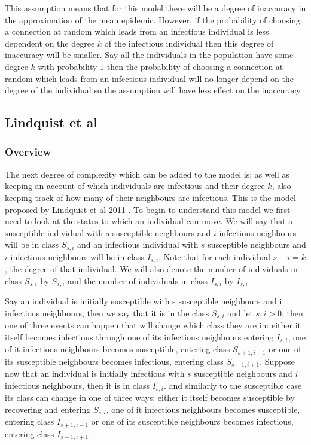 \documentclass{uonmathsreport}
\begin{document}
This assumption means that for this model there will be a degree of inaccuracy in the approximation of the mean epidemic. However, if the probability of choosing a connection at random which leads from an infectious individual is less dependent on the degree $k$ of the infectious individual then this degree of inaccuracy will be smaller. Say all the individuals in the population have some degree $k$ with probability $1$ then the probability of choosing a connection at random which leads from an infectious individual will no longer depend on the degree of the individual so the assumption will have less effect on the inaccuracy.

\subsection{Lindquist et al} \label{subsec:6.2}

\subsubsection{Overview} \label{subsub:6.2.1}
\indent
The next degree of complexity which can be added to the model is: as well as keeping an account of which individuals are infectious and their degree $k$, also keeping track of how many of their neighbours are infectious. This is the model proposed by Lindquist et al 2011 \cite{biblindquist}. To begin to understand this model we first need to look at the states to which an individual can move. We will say that a susceptible individual with $s$ susceptible neighbours and $i$ infectious neighbours will be in class $S_{s,i}$ and  an infectious individual with $s$ susceptible neighbours and $i$ infectious neighbours will be in class $I_{s,i}$. Note that for each individual $s+i=k$, the degree of that individual. We will also denote the number of individuals in class $S_{s,i}$ by $S_{s,i}$ and the number of individuals in class $I_{s,i}$ by $I_{s,i}$.
\par
Say an individual is initially susceptible with s susceptible neighbours and i infectious neighbours, then we say that it is in the class $S_{s,i}$ and let $s,i>0$, then one of three events can happen that will change which class they are in: either it itself becomes infectious through one of its infectious neighbours entering $I_{s,i}$, one of it infectious neighbours becomes susceptible, entering class $S_{s+1,i-1}$ or one of its susceptible neighbours becomes infectious, entering class $S_{s-1,i+1}$. Suppose now that an individual is initially infectious with $s$ susceptible neighbours and $i$ infectious neighbours, then it is in class $I_{s,i}$. and similarly to the susceptible case its class can change in one of three ways: either it itself becomes susceptible by recovering and entering $S_{s,i}$, one of it infectious neighbours becomes susceptible, entering class $I_{s+1,i-1}$ or one of its susceptible neighbours becomes infectious, entering class $I_{s-1,i+1}$. 
\end{document}
